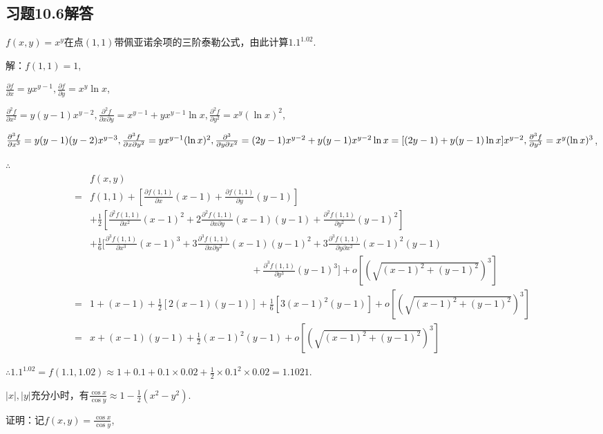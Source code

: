 \documentclass[12pt,UTF8]{ctexart}
\begin{document}
\subsection{习题10.6解答}
\begin{enumerate}
$f(x,y)=x^y$在点$(1,1)$带佩亚诺余项的三阶泰勒公式，由此计算$1.1^{1.02}$.

解：$f(1,1)=1$,

$\frac{\partial f}{\partial x}=yx^{y-1},\frac{\partial f}{\partial y}=x^y\ln x$,

$\frac{\partial^2f}{\partial x^2}=y(y-1)x^{y-2},\frac{\partial^2f}{\partial x\partial y}=x^{y-1}+yx^{y-1}\ln x,\frac{\partial^2f}{\partial y^2}=x^y(\ln x)^2$,

$\frac{\partial^3f}{\partial x^3}=y(y-1)(y-2)x^{y-3},\frac{\partial^3f}{\partial x\partial y^2}=yx^{y-1}(\ln x)^2,\\
\frac{\partial^3}{\partial y\partial x^2}=(2y-1)x^{y-2}+y(y-1)x^{y-2}\ln x=[(2y-1)+y(y-1)\ln x]x^{y-2},\\
\frac{\partial^3f}{\partial y^3}=x^y(\ln x)^3$,

$\therefore$
\[\begin{split}
&f(x,y)\\
=&f(1,1)+[\frac{\partial f(1,1)}{\partial x}(x-1)+\frac{\partial f(1,1)}{\partial y}(y-1)]\\
&+\frac12[\frac{\partial^2f(1,1)}{\partial x^2}(x-1)^2+2\frac{\partial^2f(1,1)}{\partial x\partial y}(x-1)(y-1)+\frac{\partial^2f(1,1)}{\partial y^2}(y-1)^2]\\
&+\frac16[\frac{\partial^3f(1,1)}{\partial x^3}(x-1)^3+3\frac{\partial^3f(1,1)}{\partial x\partial y^2}(x-1)(y-1)^2+3\frac{\partial^3f(1,1)}{\partial y\partial x^2}(x-1)^2(y-1)\\
&\hspace{7cm}+\frac{\partial^3f(1,1)}{\partial y^3}(y-1)^3]+o[(\sqrt{(x-1)^2+(y-1)^2})^3]\\
=&1+(x-1)+\frac12[2(x-1)(y-1)]+\frac16[3(x-1)^2(y-1)]+o[(\sqrt{(x-1)^2+(y-1)^2})^3]\\
=&x+(x-1)(y-1)+\frac12(x-1)^2(y-1)+o[(\sqrt{(x-1)^2+(y-1)^2})^3]
\end{split}\]

$\therefore1.1^{1.02}=f(1.1,1.02)\approx1+0.1+0.1\times0.02+\frac12\times0.1^2\times0.02=1.1021$.

$|x|,|y|$充分小时，有$\frac{\cos x}{\cos y}\approx1-\frac12(x^2-y^2)$.

证明：记$f(x,y)=\frac{\cos x}{\cos y}$,


\end{enumerate}
\end{document}
